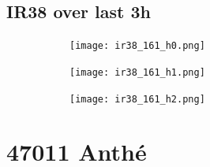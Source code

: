 \documentclass{article}
\begin{document}
\vspace{-1em}
\subsection*{IR38 over last 3h}
\vspace{-1em}
\begin{figure}[H]
    \centering
    \begin{subfigure}[b]{0.32\textwidth}
        \centering
        \texttt{[image: ir38\_161\_h0.png]} %
    \end{subfigure}
    \begin{subfigure}[b]{0.32\textwidth}
        \centering
        \texttt{[image: ir38\_161\_h1.png]} %
    \end{subfigure}
    \begin{subfigure}[b]{0.32\textwidth}
        \centering
        \texttt{[image: ir38\_161\_h2.png]} %
    \end{subfigure}
\end{figure}

\vspace{-1em}
\section*{47011 Anthé}
\vspace{-1em}
\end{document}
